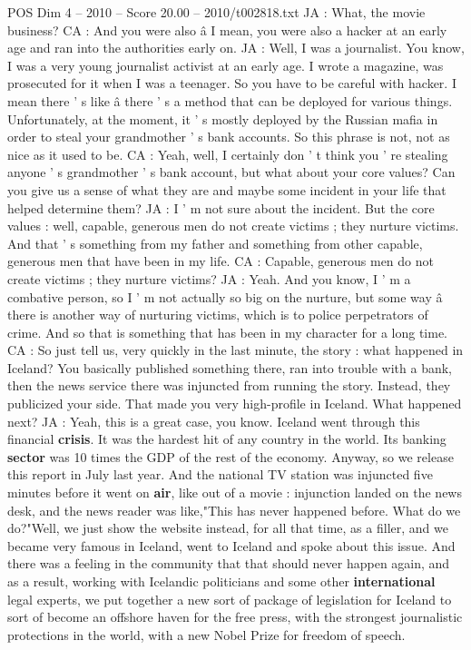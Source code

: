 \begin{textsample}{POS Dim 4 – 2010 – Score 20.00 – 2010/t002818.txt}
JA : What, the movie business?
CA : And you were also â I mean, you were also a hacker at an early age and ran into the authorities early on.
JA : Well, I was a journalist.
You know, I was a very young journalist activist at an early age.
I wrote a magazine, was prosecuted for it when I was a teenager.
So you have to be careful with hacker.
I mean there ' s like â there ' s a method that can be deployed for various things.
Unfortunately, at the moment, it ' s mostly deployed by the Russian mafia in order to steal your grandmother ' s bank accounts.
So this phrase is not, not as nice as it used to be.
CA : Yeah, well, I certainly don ' t think you ' re stealing anyone ' s grandmother ' s bank account, but what about your core values?
Can you give us a sense of what they are and maybe some incident in your life that helped determine them?
JA : I ' m not sure about the incident.
But the core values : well, capable, generous men do not create victims ; they nurture victims.
And that ' s something from my father and something from other capable, generous men that have been in my life.
CA : Capable, generous men do not create victims ; they nurture victims?
JA : Yeah.
And you know, I ' m a combative person, so I ' m not actually so big on the nurture, but some way â there is another way of nurturing victims, which is to police perpetrators of crime.
And so that is something that has been in my character for a long time.
CA : So just tell us, very quickly in the last minute, the story : what happened in Iceland?
You basically published something there, ran into trouble with a bank, then the news service there was injuncted from running the story.
Instead, they publicized your side.
That made you very high-profile in Iceland.
What happened next?
JA : Yeah, this is a great case, you know.
Iceland went through this financial \textbf{crisis}.
It was the hardest hit of any country in the world.
Its banking \textbf{sector} was 10 times the GDP of the rest of the economy.
Anyway, so we release this report in July last year.
And the national TV station was injuncted five minutes before it went on \textbf{air}, like out of a movie : injunction landed on the news desk, and the news reader was like,"This has never happened before.
What do we do?"Well, we just show the website instead, for all that time, as a filler, and we became very famous in Iceland, went to Iceland and spoke about this issue.
And there was a feeling in the community that that should never happen again, and as a result, working with Icelandic politicians and some other \textbf{international} legal experts, we put together a new sort of package of legislation for Iceland to sort of become an offshore haven for the free press, with the strongest journalistic protections in the world, with a new Nobel Prize for freedom of speech.

\end{textsample}
